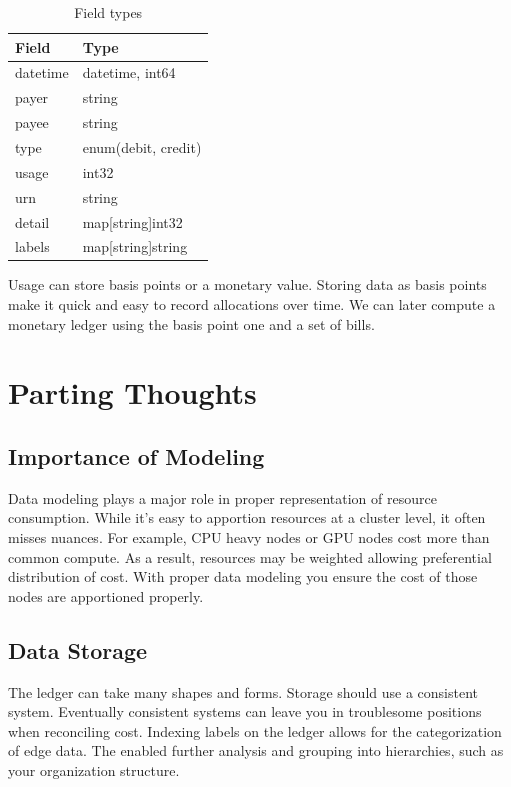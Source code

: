 \documentclass[10pt, a4paper, twocolumn]{article}
\begin{document}
    \begin{table}[H]
      \centering
      \begin{tabular}{ l|l }
        Field & Type \\
        \hline
        datetime & datetime, int64 \\
        payer & string \\
        payee & string \\
        type & enum(debit, credit) \\
        usage & int32 \\
        urn & string \\
        detail & map[string]int32 \\
        labels & map[string]string \\
      \end{tabular}
      \caption{Field types}
      \label{table:4}
    \end{table}

    Usage can store basis points or a monetary value.
    Storing data as basis points make it quick and easy to record allocations over time.
    We can later compute a monetary ledger using the basis point one and a set of bills.

\section*{Parting Thoughts}
  \subsection*{Importance of Modeling}
    Data modeling plays a major role in proper representation of resource consumption.
    While it's easy to apportion resources at a cluster level, it often misses nuances.
    For example, CPU heavy nodes or GPU nodes cost more than common compute.
    As a result, resources may be weighted allowing preferential distribution of cost.
    With proper data modeling you ensure the cost of those nodes are apportioned properly.

  \subsection*{Data Storage}
    The ledger can take many shapes and forms.
    Storage should use a consistent system.
    Eventually consistent systems can leave you in troublesome positions when reconciling cost.
    Indexing labels on the ledger allows for the categorization of edge data.
    The enabled further analysis and grouping into hierarchies, such as your organization structure.
\end{document}
